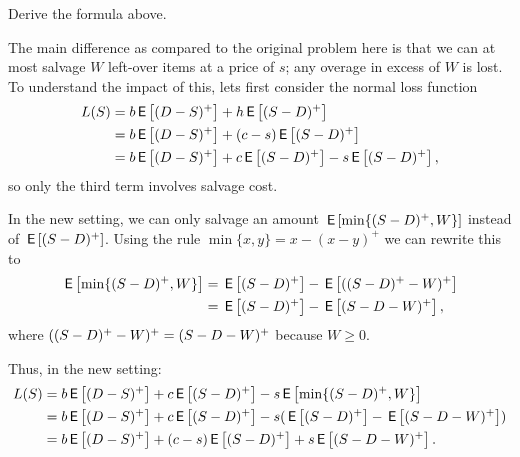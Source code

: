 \begin{exercise}  
Derive the formula above.
\begin{solution}
The main difference as compared to the original problem here is that we can at most salvage $W$ left-over items at a price of $s$; any overage in excess of $W$ is lost. To understand the impact of this, lets first consider the normal loss function
\begin{align*}
   L(S) 
 &= b\,\mathsf{E}\left[(D-S)^+\right] + h \,\mathsf{E}\left[(S-D)^+\right] \\
 &= b\,\mathsf{E}\left[(D-S)^+\right] + (c-s) \,\mathsf{E}\left[(S-D)^+\right] \\
 &= b\,\mathsf{E}\left[(D-S)^+\right] + c\,\mathsf{E}\left[(S-D)^+\right] - s\,\mathsf{E}\left[(S-D)^+\right],
 \end{align*}
so only the third term involves salvage cost. 

In the new setting, we can only salvage an amount $\,\mathsf{E}\left[\min\{(S-D)^+, W\}\right]$ instead of $\,\mathsf{E}\left[(S-D)^+\right]$. Using the rule $\min\{x, y\} = x - (x-y)^+$ we can rewrite this to
\begin{align*}
\,\mathsf{E}\left[\min\{(S-D)^+, W\}\right] 
&=  \,\mathsf{E}\left[(S-D)^+\right] - \,\mathsf{E}\left[((S-D)^+- W)^+\right] \\
&=  \,\mathsf{E}\left[(S-D)^+\right] - \,\mathsf{E}\left[(S-D- W)^+\right],
\end{align*}
where $((S-D)^+-W)^+=(S-D-W)^+$ because $W\geq 0$. 

Thus, in the new setting:
\begin{align*}
  L(S) 
 &= b\,\mathsf{E}\left[(D-S)^+\right] + c \,\mathsf{E}\left[(S-D)^+\right] - s\,\mathsf{E}\left[\min\{(S-D)^+, W\}\right] \\
 &= b\,\mathsf{E}\left[(D-S)^+\right] + c \,\mathsf{E}\left[(S-D)^+\right] - s (\,\mathsf{E}\left[(S-D)^+\right] - \,\mathsf{E}\left[(S-D- W)^+\right]) \\
 &= b\,\mathsf{E}\left[(D-S)^+\right] + (c-s) \,\mathsf{E}\left[(S-D)^+\right] + s \,\mathsf{E}\left[(S-D- W)^+\right].
\end{align*}
\end{solution}
\end{exercise}

